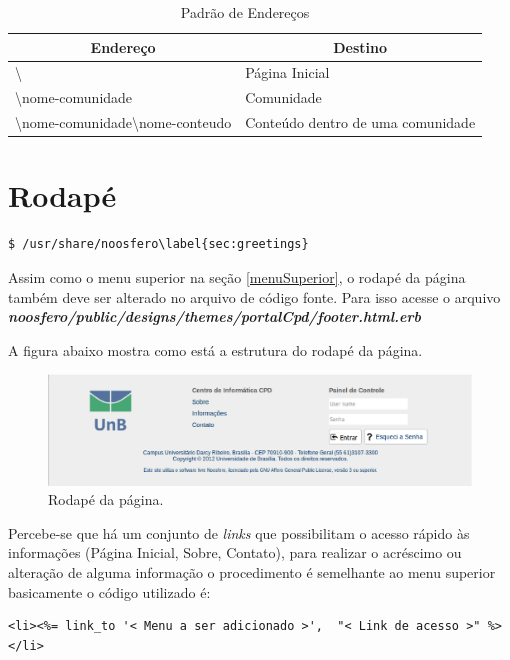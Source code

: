 \begin{table}[h]
\begin{tabular}{|l|l|}
  \hline
  \multicolumn{1}{|c|}{\textbf{Endereço}} & \multicolumn{1}{c|}{\textbf{Destino}} \\
  \hline
  \textbackslash & Página Inicial \\
  \textbackslash nome-comunidade & Comunidade \\
  \textbackslash nome-comunidade\textbackslash nome-conteudo & Conteúdo dentro de uma comunidade \\
  \hline
\end{tabular}
\caption {Padrão de Endereços}
\end{table}

\section{Rodapé}

\begin{lstlisting}
$ /usr/share/noosfero\label{sec:greetings}
\end{lstlisting}

Assim como o menu superior na seção \ref{menuSuperior}, o rodapé da página também deve ser alterado no arquivo de código fonte. Para isso acesse o arquivo \textbf{\textit{noosfero/public/designs/themes/portalCpd/footer.html.erb}}

A figura abaixo mostra como está a estrutura do rodapé da página.
\begin{figure}[h]
     \centering
       \includegraphics[keepaspectratio=true,scale=0.49]{figuras/footer.eps}
     \caption{Rodapé da página.}
\end{figure}

Percebe-se que há um conjunto de \emph{links} que possibilitam o acesso rápido às informações (Página Inicial, Sobre, Contato), para realizar o acréscimo ou alteração de alguma informação o procedimento é semelhante ao menu superior basicamente o código utilizado é:

\begin{lstlisting}
<li><%= link_to '< Menu a ser adicionado >',  "< Link de acesso >" %></li>
\end{lstlisting}

